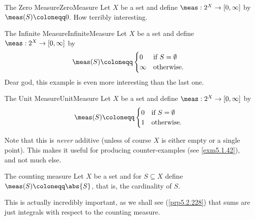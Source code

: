 \begin{exm}{The Zero Measure}{ZeroMeasure}{}
Let $X$ be a set and define $\meas :2^X\rightarrow [0,\infty ]$ by $\meas (S)\coloneqq 0$.  How terribly interesting.
\end{exm}
\begin{exm}{The Infinite Measure}{InfiniteMeasure}
Let $X$ be a set and define $\meas :2^X\rightarrow [0,\infty ]$ by
\begin{equation}
\meas (S)\coloneqq \begin{cases}0 & \text{if }S=\emptyset \\ \infty & \text{otherwise.}\end{cases}
\end{equation}
Dear god, this example is even more interesting than the last one.
\end{exm}
\begin{exm}{The Unit Measure}{UnitMeasure}
Let $X$ be a set and define $\meas :2^X\rightarrow [0,\infty ]$ by
\begin{equation}
\meas (S)\coloneqq \begin{cases}0 & \text{if }S=\emptyset \\ 1 & \text{otherwise.}\end{cases}
\end{equation}
\begin{rmk}
Note that this is \emph{never} additive (unless of course $X$ is either empty or a single point).  This makes it useful for producing counter-examples (see \cref{exm5.1.42}), and not much else.
\end{rmk}
\end{exm}
\begin{exm}{The counting measure}{}
Let $X$ be a set and for $S\subseteq X$ define $\meas (S)\coloneqq \abs{S}$, that is, the cardinality of $S$.
\begin{rmk}
This is actually incredibly important, as we shall see (\cref{prp5.2.228}) that sums are just integrals with respect to the counting measure.
\end{rmk}
\end{exm}

